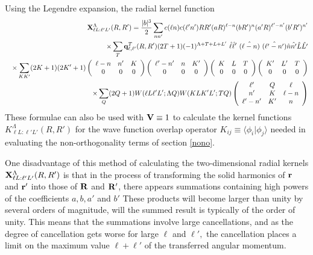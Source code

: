 \documentclass[11pt,a4paper]{article}
\newcommand{\vecr}{{\bf r}}
\newcommand{\vecR}{{\bf R}}
\begin{document}
Using the Legendre expansion, the radial kernel function
\begin{eqnarray} \nonumber
&&{\bf X}^\Lambda_{\ell L: \ell' L'} (R,R' )
   =  {| b |^3 \over 2} \sum_{nn'} c(\ell n) c(\ell' n')
        R R' (aR)^{\ell - n} (bR')^n
        (a' R)^{\ell' - n'} (b' R')^{n'}
\nonumber
\\\nonumber
 && \times \sum_T  {\bf q}^T_ {\ell , \ell'} (R,R')
        (2T+1) (-1)^{\Lambda+T+L+L'} ~
          \hat \ell \hat \ell' ~\hat{(\ell - n)}~ \hat{(\ell' - n')}
              \hat n \hat {n'} \hat L \hat {L'}
\nonumber
\\\nonumber
 && \times \sum_{K K'} (2K+1)(2K' + 1)
        \left ( \begin{array}{ccc}\ell - n&n'&K\\0&0&0 \end{array} \right )
        \left ( \begin{array}{ccc}\ell'-n'&n&K'\\0&0&0 \end{array} \right )
        \left ( \begin{array}{ccc}K&L &T\\0&0&0 \end{array} \right )
        \left ( \begin{array}{ccc}K'&L'&T\\0&0&0 \end{array} \right ) \nonumber
\\
  && \times \sum_{Q} (2Q+1)
        W(\ell L \ell' L' ; \Lambda Q)
        W(K L K' L' ; T Q)
        \left ( \begin{array}{ccc} \ell'&Q&\ell\\ n'&K&\ell-n\\\ell' - n'&K'&n \end{array} \right )
        \label{useq}
\end{eqnarray}
These formulae can also be used with $ {\bf V} \equiv 1$ to calculate the kernel
functions $ K^\Lambda_{\ell L: \ell' L'} (R,R' ) $
for the wave function overlap operator
$K_{ij} \equiv\langle\phi_i |\phi_j\rangle $
needed in evaluating the non-orthogonality terms of section \ref{nono}.

One disadvantage of this method of calculating the two-dimensional
radial kernels
${\bf X}^\Lambda_{\ell L: \ell' L'} (R,R' ) $
is that in the process of transforming the solid harmonics of
$ \vecr $ and $\vecr' $ into those of
$ \vecR $ and $\vecR' $, there appears summations containing
high powers of the coefficients $ a, b, a' $ and $b'$
These products will become larger than unity by several orders of
magnitude, will the summed result is typically of the order of
unity.  This means that
the summations involve large cancellations,
and as the degree of cancellation gets worse for large
$ \ell $ and $ \ell' ,$ the cancellation places a limit
on the maximum value $ \ell + \ell' $ of the
transferred angular momentum.
\end{document}
